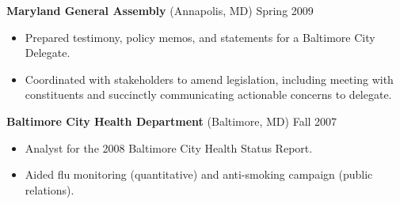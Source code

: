 \documentclass[margin]{res}
\newcommand{\locdatesubsection}[3]{\textbf{#1} (#2) \hfill #3}
\begin{document}
\begin{sloppypar}
\begin{resume}


\locdatesubsection{Maryland General Assembly}{Annapolis, MD}{Spring 2009}
\begin{itemize}
\item Prepared testimony, policy memos, and statements for a Baltimore City Delegate.
\item Coordinated with stakeholders to amend legislation, including meeting with constituents and succinctly communicating actionable concerns to delegate.
\end{itemize}

\locdatesubsection{Baltimore City Health Department}{Baltimore, MD}{Fall 2007}
\begin{itemize}
\item Analyst for the 2008 Baltimore City Health Status Report. 
\item Aided flu monitoring (quantitative) and anti-smoking campaign (public relations).
\end{itemize}



\end{resume}
\end{sloppypar}
\end{document}
